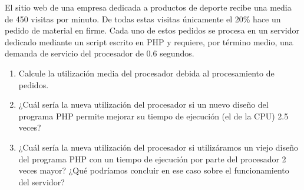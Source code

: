 \begin{ejercicio}\label{ej:5.7}
    El sitio web de una empresa dedicada a productos de deporte recibe una media de 450 visitas por minuto. De todas estas visitas únicamente el 20\% hace un pedido de material en firme. Cada uno de estos pedidos se procesa en un servidor dedicado mediante un script escrito en PHP y requiere, por término medio, una demanda de servicio del procesador de 0.6 segundos.
    \begin{enumerate}
        \item Calcule la utilización media del procesador debida al procesamiento de pedidos.
        \item ¿Cuál sería la nueva utilización del procesador si un nuevo diseño del programa PHP permite mejorar su tiempo de ejecución (el de la CPU) 2.5 veces?
        \item ¿Cuál sería la nueva utilización del procesador si utilizáramos un viejo diseño del programa PHP con un tiempo de ejecución por parte del procesador 2 veces mayor? ¿Qué podríamos concluir en ese caso sobre el funcionamiento del servidor?
    \end{enumerate}
\end{ejercicio}
\begin{comment}
\solucion
    \begin{enumerate}
        \item La utilización del procesador es $0.9$.
        \item Con la mejora introducida la nueva utilización es de $0.36$.
        \item En ese caso la utilización sería $1$ (100\%) ya que nunca puede ser mayor que ese valor y el servidor estaría saturado.
    \end{enumerate}
\end{comment}

